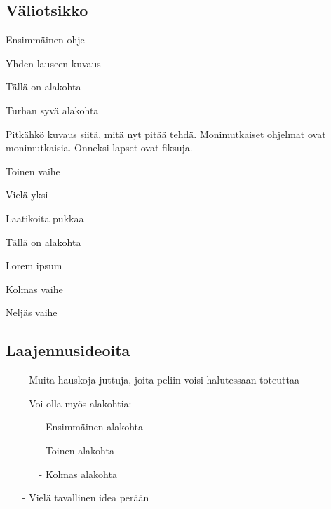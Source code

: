 \documentclass[12pt,twoside]{article}
\newenvironment{vaihetaso1}{%
    \LARGE
    \itemize
}{%
    \enditemize
}
\newenvironment{vaihetaso2}{%
    \Large
    \itemize
}{%
    \enditemize
}
\newenvironment{vaihetaso3}{%
    \large
    \itemize
}{%
    \enditemize
}
\begin{document}
\subsection*{Väliotsikko}

\begin{vaihetaso1}
	\item Ensimmäinen ohje
	\begin{vaihetaso2}
		\item Yhden lauseen kuvaus
		\item Tällä on alakohta
		\begin{vaihetaso3}
			\item Turhan syvä alakohta
		\end{vaihetaso3}
		\item Pitkähkö kuvaus siitä, mitä nyt pitää tehdä. Monimutkaiset ohjelmat ovat monimutkaisia. Onneksi lapset ovat fiksuja.
	\end{vaihetaso2}
	\item Toinen vaihe
	\item Vielä yksi
	\begin{vaihetaso2}
		\item Laatikoita pukkaa
		\item Tällä on alakohta
		\item Lorem ipsum
	\end{vaihetaso2}
	\item Kolmas vaihe
	\item Neljäs vaihe
\end{vaihetaso1}

\subsection*{Laajennusideoita}
\begin{itemize}
	\item[-] Muita hauskoja juttuja, joita peliin voisi halutessaan toteuttaa
	\item[-] Voi olla myös alakohtia:
	\begin{itemize}
		\item[-] Ensimmäinen alakohta
		\item[-] Toinen alakohta
		\item[-] Kolmas alakohta
	\end{itemize} 
	\item[-] Vielä tavallinen idea perään
\end{itemize}
\end{document}
